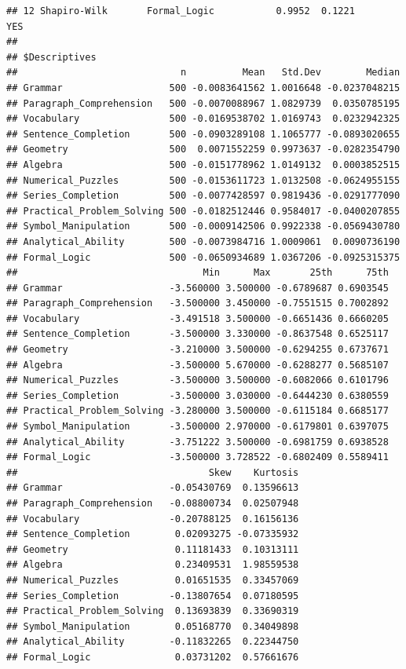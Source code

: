 \documentclass{article}\usepackage[]{graphicx}\usepackage[]{color}
\makeatletter
\newenvironment{kframe}{%
 \def\at@end@of@kframe{}%
 \ifinner\ifhmode%
  \def\at@end@of@kframe{\end{minipage}}%
  \begin{minipage}{\columnwidth}%
 \fi\fi%
 \def\FrameCommand##1{\hskip\@totalleftmargin \hskip-\fboxsep
 \colorbox{shadecolor}{##1}\hskip-\fboxsep
     \hskip-\linewidth \hskip-\@totalleftmargin \hskip\columnwidth}%
 \MakeFramed {\advance\hsize-\width
   \@totalleftmargin\z@ \linewidth\hsize
   \@setminipage}}%
 {\par\unskip\endMakeFramed%
 \at@end@of@kframe}
\newenvironment{knitrout}{}{} %
\makeatother
\begin{document}
\begin{knitrout}
\begin{kframe}
\begin{verbatim}
## 12 Shapiro-Wilk       Formal_Logic           0.9952  0.1221      YES   
## 
## $Descriptives
##                             n          Mean   Std.Dev        Median
## Grammar                   500 -0.0083641562 1.0016648 -0.0237048215
## Paragraph_Comprehension   500 -0.0070088967 1.0829739  0.0350785195
## Vocabulary                500 -0.0169538702 1.0169743  0.0232942325
## Sentence_Completion       500 -0.0903289108 1.1065777 -0.0893020655
## Geometry                  500  0.0071552259 0.9973637 -0.0282354790
## Algebra                   500 -0.0151778962 1.0149132  0.0003852515
## Numerical_Puzzles         500 -0.0153611723 1.0132508 -0.0624955155
## Series_Completion         500 -0.0077428597 0.9819436 -0.0291777090
## Practical_Problem_Solving 500 -0.0182512446 0.9584017 -0.0400207855
## Symbol_Manipulation       500 -0.0009142506 0.9922338 -0.0569430780
## Analytical_Ability        500 -0.0073984716 1.0009061  0.0090736190
## Formal_Logic              500 -0.0650934689 1.0367206 -0.0925315375
##                                 Min      Max       25th      75th
## Grammar                   -3.560000 3.500000 -0.6789687 0.6903545
## Paragraph_Comprehension   -3.500000 3.450000 -0.7551515 0.7002892
## Vocabulary                -3.491518 3.500000 -0.6651436 0.6660205
## Sentence_Completion       -3.500000 3.330000 -0.8637548 0.6525117
## Geometry                  -3.210000 3.500000 -0.6294255 0.6737671
## Algebra                   -3.500000 5.670000 -0.6288277 0.5685107
## Numerical_Puzzles         -3.500000 3.500000 -0.6082066 0.6101796
## Series_Completion         -3.500000 3.030000 -0.6444230 0.6380559
## Practical_Problem_Solving -3.280000 3.500000 -0.6115184 0.6685177
## Symbol_Manipulation       -3.500000 2.970000 -0.6179801 0.6397075
## Analytical_Ability        -3.751222 3.500000 -0.6981759 0.6938528
## Formal_Logic              -3.500000 3.728522 -0.6802409 0.5589411
##                                  Skew    Kurtosis
## Grammar                   -0.05430769  0.13596613
## Paragraph_Comprehension   -0.08800734  0.02507948
## Vocabulary                -0.20788125  0.16156136
## Sentence_Completion        0.02093275 -0.07335932
## Geometry                   0.11181433  0.10313111
## Algebra                    0.23409531  1.98559538
## Numerical_Puzzles          0.01651535  0.33457069
## Series_Completion         -0.13807654  0.07180595
## Practical_Problem_Solving  0.13693839  0.33690319
## Symbol_Manipulation        0.05168770  0.34049898
## Analytical_Ability        -0.11832265  0.22344750
## Formal_Logic               0.03731202  0.57661676

\end{verbatim}
\end{kframe}
\end{knitrout}
\end{document}

